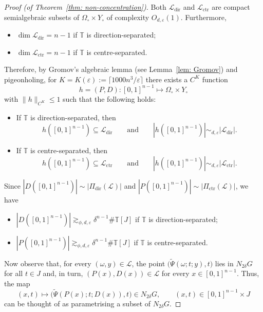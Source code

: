 \documentclass[reqno]{amsart}
\numberwithin{equation}{section}
\newcommand{\T}{\mathbb{T}}
\newcommand{\cL}{\mathcal{L}}
\theoremstyle{plain}
\theoremstyle{definition}
\newcommand{\ctr}{\mathrm{ctr}}
\newcommand{\dir}{\mathrm{dir}}
\newcommand{\ceil}[1]{\lceil #1 \rceil }
\begin{document}
\begin{proof}[Proof (of Theorem~\ref{thm: non-concentration})]
    
Both $\cL_{\dir}$ and $\cL_{\ctr}$ are compact semialgebraic subsets of $\Omega_{\circ} \times Y_{\circ}$ of complexity $O_{d, \varepsilon}(1)$. Furthermore,
\begin{itemize}
    \item $\dim \cL_{\dir} = n - 1$ if $\T$ is direction-separated;\smallskip
    \item $\dim \cL_{\ctr} = n - 1$ if $\T$ is centre-separated.\smallskip
\end{itemize}
Therefore, by Gromov's algebraic lemma (see Lemma~\ref{lem: Gromov}) and pigeonholing, for $K = K(\varepsilon) := \ceil{1000n^3/\varepsilon}$ there exists a $C^K$ function 
    \begin{equation*}
        h = (P, D) \colon [0,1]^{n-1}\mapsto \Omega_{\circ} \times Y_{\circ}
    \end{equation*}
with $\|h\|_{C^K}\leq 1$ such that the following holds:
\begin{itemize}
    \item If $\T$ is direction-separated, then
    \begin{equation*}
         h([0,1]^{n-1})\subseteq \cL_{\dir} \qquad \textrm{and} \qquad |h([0,1]^{n-1})|\sim_{d, \varepsilon} |\cL_{\dir}|.
    \end{equation*}
    \item If $\T$ is centre-separated, then 
    \begin{equation*}
        h([0,1]^{n-1})\subseteq \cL_{\ctr}  \qquad \textrm{and} \qquad  |h([0,1]^{n-1})|\sim_{d, \varepsilon} |\cL_{\ctr}|.
    \end{equation*}
\end{itemize}
Since  $|D([0,1]^{n-1})|\sim |\Pi_{\dir}(\cL)|$ and $|P([0,1]^{n-1})|\sim|\Pi_{\ctr}(\cL)|$, we have
\begin{itemize}
    \item $|D([0,1]^{n-1})|\gtrsim_{\phi,d, \varepsilon}\delta^{n-1}\#\T[J]$ if $\T$ is direction-separated; \smallskip
    \item $|P([0,1]^{n-1})|\gtrsim_{\phi,d, \varepsilon}\delta^{n-1}\#\T[J]$ if $\T$ is centre-separated.
\end{itemize}
Now observe that, for every $(\omega,y)\in \cL$, the point $\big(\widetilde{\Psi}(\omega; t; y),t\big)$ lies in $N_{2\delta} G$ for all $t\in J$ and, in turn, $(P(x), D(x))\in \cL$ for every $x\in [0,1]^{n-1}$. Thus, the map 
\begin{equation}\label{eq: const param 1}
  (x, t) \mapsto  \big(\widetilde{\Psi}(P(x); t; D(x)),t\big) \in  N_{2\delta} G, \qquad (x,t) \in [0,1]^{n-1} \times J
\end{equation}
can be thought of as parametrising a subset of $N_{2\delta} G$.\medskip



\end{proof}
\end{document}
